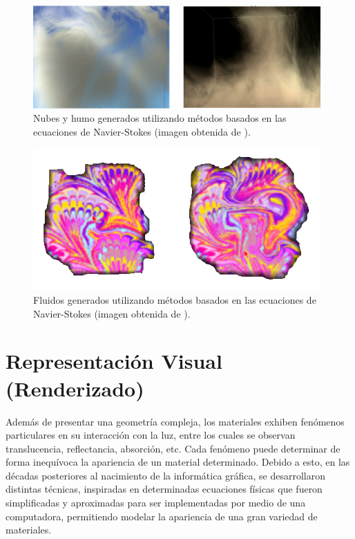 \begin{figure}
\center
\includegraphics[width=11cm]{figures/fluidos1}
\caption[Nubes y humo generados utilizando métodos basados en las ecuaciones de Navier-Stokes.]{Nubes y humo generados utilizando métodos basados en las ecuaciones de Navier-Stokes (imagen obtenida de \cite{Stam1999}).}
\label{fg:fluidos1}
\end{figure}

\begin{figure}
\center
\includegraphics[width=11cm]{figures/fluidos2}
\caption[Fluidos generados utilizando métodos basados en las ecuaciones de Navier-Stokes.]{Fluidos generados utilizando métodos basados en las ecuaciones de Navier-Stokes (imagen obtenida de \cite{Stam1999}).}
\label{fg:fluidos2}
\end{figure}


\section{Representación Visual (Renderizado)}

Además de presentar una geometría compleja, los materiales exhiben fenómenos particulares en su interacción con la luz, entre los cuales se observan translucencia, reflectancia, absorción, etc.
Cada fenómeno puede determinar de forma inequívoca la apariencia de un material determinado.
Debido a esto, en las décadas posteriores al nacimiento de la informática gráfica, se desarrollaron distintas técnicas, inspiradas en determinadas ecuaciones físicas que fueron simplificadas y aproximadas para ser implementadas por medio de una computadora, permitiendo modelar la apariencia de una gran variedad de materiales.

